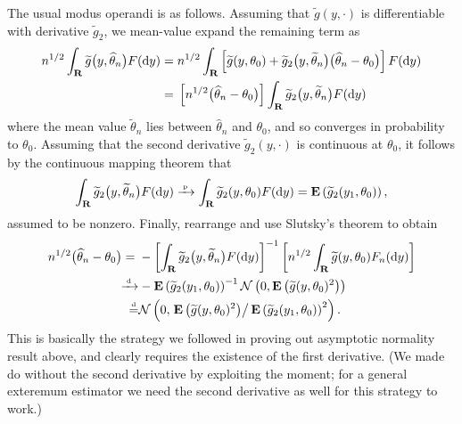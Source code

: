 \documentclass[11pt,letterpaper,reqno,oneside]{article}
\begin{document}
The usual modus operandi is as follows. Assuming that $\widetilde{g}(y,\cdot)$ is differentiable with derivative $\widetilde{g}_2$, we mean-value expand the remaining term as
%
\begin{align*}
	n^{1/2} \int_{\mathbf{R}} \widetilde{g}\bigl( y, \widehat{\theta}_n \bigr) F(\mathrm{d} y)
	={}& n^{1/2} \int_{\mathbf{R}} \left[ 
	\widetilde{g}( y, \theta_0 )
	+ \widetilde{g}_2\bigl( y, \widetilde{\theta}_n \bigr) 
	\bigl( \widehat{\theta}_n - \theta_0 \bigr)
	\right] F(\mathrm{d} y) 
	\\
	={}& \left[ n^{1/2} \bigl( \widehat{\theta}_n - \theta_0 \bigr) \right]
	\int_{\mathbf{R}} \widetilde{g}_2\bigl( y, \widetilde{\theta}_n \bigr) F(\mathrm{d} y) 
\end{align*}
%
where the mean value $\widetilde{\theta}_n$ lies between $\widehat{\theta}_n$ and $\theta_0$, and so converges in probability to $\theta_0$. Assuming that the second derivative $\widetilde{g}_2(y,\cdot)$ is continuous at $\theta_0$, it follows by the continuous mapping theorem that
%
\begin{equation*}
	\int_{\mathbf{R}} \widetilde{g}_2\bigl( y, \widetilde{\theta}_n \bigr) F(\mathrm{d} y) 
	\xrightarrow{{\scriptscriptstyle \mathrm{\;p\;}}} 
	\int_{\mathbf{R}} \widetilde{g}_2( y, \theta_0 ) F(\mathrm{d} y) 
	= \mathbf{E}\left( \widetilde{g}_2( y_1, \theta_0 ) \right) ,
\end{equation*}
%
assumed to be nonzero. Finally, rearrange and use Slutsky's theorem to obtain
%
\begin{align*}
	n^{1/2} \bigl( \widehat{\theta}_n - \theta_0 \bigr) 
	={}& - \left[ \int_{\mathbf{R}} \widetilde{g}_2\bigl( y, \widetilde{\theta}_n \bigr) F(\mathrm{d} y) \right]^{-1}
	\left[ n^{1/2} \int_{\mathbf{R}} \widetilde{g}( y, \theta_0 ) F_n(\mathrm{d} y) \right]
	\\
	\xrightarrow{{\scriptscriptstyle \mathrm{\;d\;}}}& - \mathbf{E}\left( \widetilde{g}_2( y_1, \theta_0 ) \right)^{-1}
	\mathcal{N}\left( 0, \mathbf{E}\left( \widetilde{g}( y, \theta_0 )^2 \right) \right)
	\\
	\protect\overset{{\scriptscriptstyle \mathrm{d}}}{=}& \mathcal{N}\left( 0, 
	\left. \mathbf{E}\left( \widetilde{g}( y, \theta_0 )^2 \right) \right/
	\mathbf{E}\left( \widetilde{g}_2( y_1, \theta_0 ) \right)^2 \right) .
\end{align*}
%
This is basically the strategy we followed in proving out asymptotic normality result above, and clearly requires the existence of the first derivative. (We made do without the second derivative by exploiting the moment; for a general exteremum estimator we need the second derivative as well for this strategy to work.)
\end{document}
